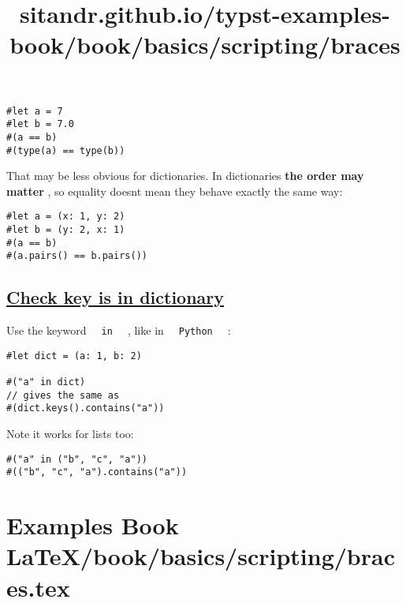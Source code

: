 \begin{verbatim}
#let a = 7
#let b = 7.0
#(a == b)
#(type(a) == type(b))
\end{verbatim}

\pandocbounded{}

That may be less obvious for dictionaries. In dictionaries \textbf{the
order may matter} , so equality doesn\textquotesingle t mean they behave
exactly the same way:

\begin{verbatim}
#let a = (x: 1, y: 2)
#let b = (y: 2, x: 1)
#(a == b)
#(a.pairs() == b.pairs())
\end{verbatim}

\pandocbounded{}

\subsection{\texorpdfstring{\hyperref[check-key-is-in-dictionary]{Check
key is in
dictionary}}{Check key is in dictionary}}\label{check-key-is-in-dictionary}

Use the keyword \texttt{\ }{\texttt{\ in\ }}\texttt{\ } , like in
\texttt{\ }{\texttt{\ Python\ }}\texttt{\ } :

\begin{verbatim}
#let dict = (a: 1, b: 2)

#("a" in dict)
// gives the same as
#(dict.keys().contains("a"))
\end{verbatim}

\pandocbounded{}

Note it works for lists too:

\begin{verbatim}
#("a" in ("b", "c", "a"))
#(("b", "c", "a").contains("a"))
\end{verbatim}

\pandocbounded{}


\section{Examples Book LaTeX/book/basics/scripting/braces.tex}
\title{sitandr.github.io/typst-examples-book/book/basics/scripting/braces}

